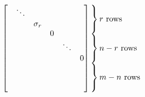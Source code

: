 \documentclass{article}
\begin{document}
\begin{align*}
\begin{bmatrix}
                                                            & \ddots &          &   &        &   \\
                                                            &        & \sigma_r &   &        &   \\
                                                            &        &          & 0 &        &   \\
                                                            &        &          &   & \ddots &   \\
                                                            &        &          &   &        & 0 \\
                                                            &        &          &   &        &   \\
                                                            &        &          &   &        &   \\
                                                            &        &          &   &        &
                                               \end{bmatrix}
    \setlength{\arraycolsep}{0pt} %
    \begin{array}{ l }
        \left.\kern-\nulldelimiterspace
        \vphantom{\begin{array}{ c }
                          0 \\ %
                          0 \\ %
                          0     %
                      \end{array}}
        \right\}\text{\(r\) rows}     \\
        \left.\kern-\nulldelimiterspace
        \vphantom{\begin{array}{ c }
                          0 \\ %
                          0 \\ %
                          0     %
                      \end{array}}
        \right\}\text{\(n - r\) rows} \\
        \left.\kern-\nulldelimiterspace
        \vphantom{\begin{array}{ c }
                          0 \\ %
                          0 \\ %
                          0     %
                      \end{array}}
        \right\}\text{\(m - n\) rows}
    \end{array}
\end{align*}
\end{document}
